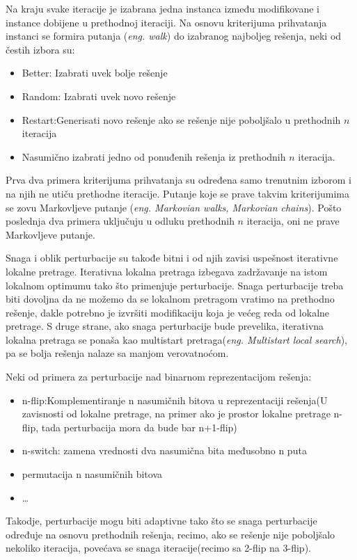 \documentclass[a4paper]{article}
\begin{document}
Na kraju svake iteracije je izabrana jedna instanca između modifikovane i instance dobijene u prethodnoj iteraciji. Na osnovu kriterijuma prihvatanja instanci se formira putanja (\emph{eng. walk}) do izabranog najboljeg rešenja, neki od čestih izbora su:
\begin{itemize}
\item Better: Izabrati uvek bolje rešenje
\item Random: Izabrati uvek novo rešenje
\item Restart:Generisati novo rešenje ako se rešenje nije poboljšalo u prethodnih $n$ iteracija
\item Nasumično izabrati jedno od ponuđenih rešenja iz prethodnih $n$ iteracija.
\end{itemize}

Prva dva primera kriterijuma prihvatanja su određena samo trenutnim izborom i na njih ne utiču prethodne iteracije. Putanje koje se prave takvim kriterijumima se zovu Markovljeve putanje (\emph{eng. Markovian walks, Markovian chains}). Pošto poslednja dva primera uključuju u odluku prethodnih $n$ iteracija, oni ne prave Markovljeve putanje. 

Snaga i oblik perturbacije su takođe bitni i od njih zavisi uspešnost iterativne lokalne pretrage. Iterativna lokalna pretraga izbegava zadržavanje na istom lokalnom optimumu tako što primenjuje perturbacije. Snaga perturbacije treba biti dovoljna da ne možemo da se lokalnom pretragom vratimo na prethodno rešenje, dakle potrebno je izvršiti modifikaciju koja je većeg reda od lokalne pretrage. S druge strane, ako snaga perturbacije bude prevelika, iterativna lokalna pretraga se ponaša kao multistart pretraga(\emph{eng. Multistart local search}), pa se bolja rešenja nalaze sa manjom verovatnoćom. 

Neki od primera za perturbacije nad binarnom reprezentacijom rešenja:
\begin{itemize}
\item n-flip:Komplementiranje n nasumičnih bitova u reprezentaciji rešenja(U zavisnosti od lokalne pretrage, na primer
ako je prostor lokalne pretrage n-flip, tada perturbacija mora da bude bar n+1-flip)
\item n-switch: zamena vrednosti dva nasumična bita međusobno n puta
\item permutacija n nasumičnih bitova
\item \ldots
\end{itemize}

Takodje, perturbacije mogu biti adaptivne tako što se snaga perturbacije određuje na osnovu prethodnih rešenja, recimo, ako se rešenje nije poboljšalo nekoliko iteracija, povećava se snaga iteracije(recimo sa 2-flip na 3-flip).
\end{document}

